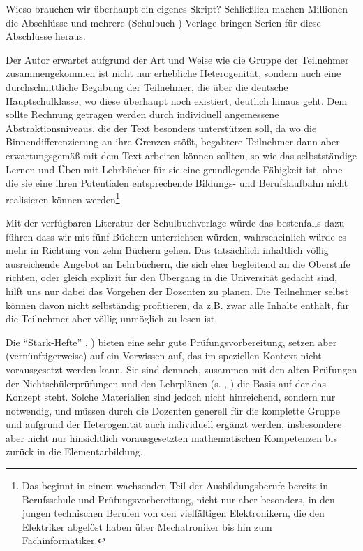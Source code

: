 \documentclass[a4paper]{book}%
\theoremstyle{definition}
\begin{document}
Wieso brauchen wir überhaupt ein eigenes Skript? Schließlich machen Millionen die Abschlüsse und mehrere (Schulbuch-) Verlage bringen Serien für diese Abschlüsse heraus.

Der Autor erwartet aufgrund der Art und Weise wie die Gruppe der Teilnehmer zusammengekommen ist nicht nur erhebliche Heterogenität, sondern auch eine durchschnittliche Begabung der Teilnehmer, die über die deutsche Hauptschulklasse, wo diese überhaupt noch existiert, deutlich hinaus geht. Dem sollte Rechnung getragen werden durch individuell angemessene Abstraktionsniveaus, die der Text besonders unterstützen soll, da wo die Binnendifferenzierung an ihre Grenzen stößt, begabtere Teilnehmer dann aber erwartungsgemäß mit dem Text arbeiten können sollten, so wie das selbstständige Lernen und Üben mit Lehrbücher für sie eine grundlegende Fähigkeit ist, ohne die sie eine ihren Potentialen entsprechende Bildungs- und Berufslaufbahn nicht realisieren können werden\footnote{Das beginnt in einem wachsenden Teil der Ausbildungsberufe bereits in Berufsschule und Prüfungsvorbereitung, nicht nur aber besonders, in den jungen technischen Berufen von den vielfältigen Elektronikern, die den Elektriker abgelöst haben über Mechatroniker bis hin zum Fachinformatiker.}.

Mit der verfügbaren Literatur der Schulbuchverlage würde das bestenfalls dazu führen dass wir mit fünf Büchern unterrichten würden, wahrscheinlich würde es mehr in Richtung von zehn Büchern gehen. Das tatsächlich inhaltlich völlig ausreichende Angebot an Lehrbüchern, die sich eher begleitend an die Oberstufe richten, oder gleich explizit für den Übergang in die Universität gedacht sind, hilft uns nur dabei das Vorgehen der Dozenten zu planen. Die Teilnehmer selbst können davon nicht selbständig profitieren, da z.B. \citep{Arens2015} zwar alle Inhalte enthält, für die Teilnehmer aber völlig unmöglich zu lesen ist.

Die \enquote{Stark-Hefte} \citep{StarkHSAMaHe2018}, \citep{StarkRSAMaHe2018}) bieten eine sehr gute Prüfungsvorbereitung, setzen aber (vernünftigerweise) auf ein Vorwissen auf, das im speziellen Kontext nicht vorausgesetzt werden kann. Sie sind dennoch, zusammen mit den alten Prüfungen der Nichtschülerprüfungen und den Lehrplänen (s. \citep{LehrplanMathematikHauptschuleHessen2017}, \citep{LehrplanMathematikRealschuleHessen2017}) die Basis auf der das Konzept steht. Solche Materialien sind jedoch nicht hinreichend, sondern nur notwendig, und müssen durch die Dozenten generell für die komplette Gruppe und aufgrund der Heterogenität auch individuell ergänzt werden, insbesondere aber nicht nur hinsichtlich vorausgesetzten mathematischen Kompetenzen bis zurück in die Elementarbildung.
\end{document}
